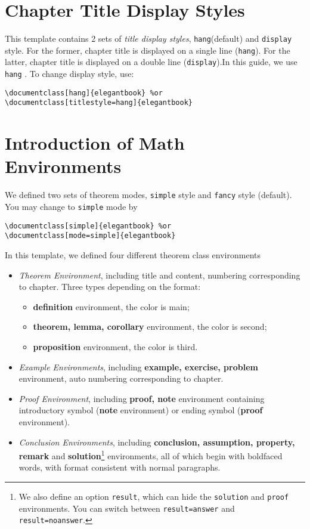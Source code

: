 \section{Chapter Title Display Styles}

This template contains 2 sets of \textit{title display styles}, \lstinline{hang}(default) and \lstinline{display}
style. For the former, chapter title is displayed on a single line (\lstinline{hang}). For the latter, chapter title is displayed on a double line (\lstinline{display}).In this guide, we use \lstinline{hang} . To change display style, use:
\begin{lstlisting}
\documentclass[hang]{elegantbook} %or
\documentclass[titlestyle=hang]{elegantbook}
\end{lstlisting}


\section{Introduction of Math Environments}
We defined two sets of theorem modes, \lstinline{simple} style and \lstinline{fancy} style (default). You may change to \lstinline{simple} mode by

\begin{lstlisting}
\documentclass[simple]{elegantbook} %or
\documentclass[mode=simple]{elegantbook}
\end{lstlisting}

In this template, we defined four different theorem class environments

\begin{itemize}
    \item \textit{Theorem Environment}, including title and content, numbering corresponding to chapter. Three types depending on the format:
    \begin{itemize}
        \item \textcolor{main}{\textbf{definition}} environment, the color is  \textcolor{main}{main};
        \item \textcolor{second}{\textbf{theorem, lemma, corollary}} environment, the color is \textcolor{second} {second};
        \item \textcolor{third}{\textbf{proposition}} environment, the color is \textcolor{third}{third}.
    \end{itemize}
    \item \textit{Example Environments}, including \textbf{example, exercise, problem} environment, auto numbering corresponding to chapter.
    \item \textit{Proof Environment}, including \textbf{proof, note} environment containing introductory symbol (\textbf{note} environment) or ending symbol (\textbf{proof} environment).
    \item \textit{Conclusion Environments}, including \textbf{conclusion, assumption, property, remark} and
    \textbf{solution}\footnote{We also define an option \lstinline{result}, which can hide the \lstinline{solution}
    and \lstinline{proof} environments. You can switch between \lstinline{result=answer} and \lstinline{result=noanswer}.} environments, all of which begin with boldfaced words, with format consistent with normal paragraphs.
\end{itemize}

